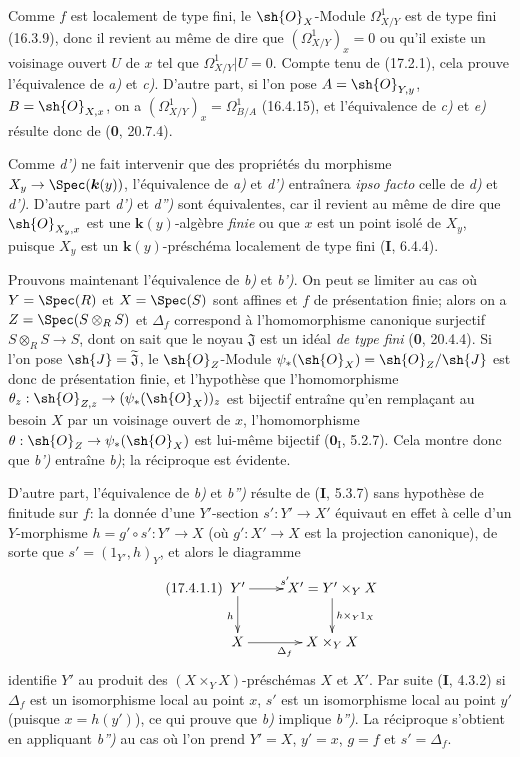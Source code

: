 Comme $f$ est localement de type fini, le $\sh{O}_X$-Module $\varOmega^1_{X/Y}$ est de type fini (16.3.9), donc il revient au même de dire que $(\varOmega^1_{X/Y})_x=0$ ou qu'il existe un voisinage ouvert $U$ de $x$ tel que $\varOmega^1_{X/Y}|U=0$. Compte tenu de (17.2.1), cela prouve l'équivalence de \emph{a)} et \emph{c)}. D'autre part, si l'on pose $A=\sh{O}_{Y,y}$, $B=\sh{O}_{X,x}$, on a $(\varOmega^1_{X/Y})_x=\Omega^1_{B/A}$ (16.4.15), et l'équivalence de \emph{c)} et \emph{e)} résulte donc de (\textbf{0}, 20.7.4).

Comme \emph{d')} ne fait intervenir que des propriétés du morphisme $X_y\to\Spec(\boldsymbol{k}(y))$, l'équivalence de \emph{a)} et \emph{d')} entraînera \emph{ipso facto} celle de \emph{d)} et \emph{d')}. D'autre part \emph{d')} et \emph{d'')} sont équivalentes, car il revient au même de dire que $\sh{O}_{X_y,x}$ est une $\boldsymbol{k}(y)$-algèbre \emph{finie} ou que $x$ est un point isolé de $X_y$, puisque $X_y$ est un $\boldsymbol{k}(y)$-préschéma localement de type fini (\textbf{I}, 6.4.4).

Prouvons maintenant l'équivalence de \emph{b)} et \emph{b')}. On peut se limiter au cas où $Y=\Spec(R)$ et $X=\Spec(S)$ sont affines et $f$ de présentation finie; alors on a $Z=\Spec(S\otimes_R S)$ et $\Delta_f$ correspond à l'homomorphisme canonique surjectif $S\otimes_R S\to S$, dont on sait que le noyau $\mathfrak{J}$ est un idéal \emph{de type fini} (\textbf{0}, 20.4.4). Si l'on pose $\sh{J}=\widetilde{\mathfrak{J}}$, le $\sh{O}_Z$-Module $\psi_*(\sh{O}_X)=\sh{O}_Z/\sh{J}$ est donc de présentation finie, et l'hypothèse que l'homomorphisme $\theta_z: \sh{O}_{Z,z}\to(\psi_*(\sh{O}_X))_z$ est bijectif entraîne qu'en remplaçant au besoin $X$ par un voisinage ouvert de $x$, l'homomorphisme $\theta:\sh{O}_Z\to\psi_*(\sh{O}_X)$ est lui-même bijectif ($\mathbf{0}_{\mathrm I}$, 5.2.7). Cela montre donc que \emph{b')} entraîne \emph{b)}; la réciproque est évidente.

D'autre part, l'équivalence de \emph{b)} et \emph{b'')} résulte de (\textbf{I}, 5.3.7) sans hypothèse de finitude sur $f$: la donnée d'une $Y'$-section $s':Y'\to X'$ équivaut en effet à celle d'un
$Y$-morphisme $h=g'\circ s':Y'\to X$ (où $g':X'\to X$ est la projection canonique), de sorte que $s'=(1_{Y'},h)_Y$, et alors le diagramme
\[
\tag{17.4.1.1}
\label{IV.17.4.1.1}
\xymatrix{
Y' \ar[r]^{s'} \ar[d]_h & X'=Y'\times_Y X \ar[d]^{h\times_Y 1_X}\\
X \ar[r]_{\Delta_f} & X\times_Y X
}
\]
identifie $Y'$ au produit des $(X\times_Y X)$-préschémas $X$ et $X'$. Par suite (\textbf{I}, 4.3.2) si $\Delta_f$ est un isomorphisme local au point $x$, $s'$ est un isomorphisme local au point $y'$ (puisque $x=h(y')$), ce qui prouve que \emph{b)} implique \emph{b'')}. La réciproque s'obtient en appliquant \emph{b'')} au cas où l'on prend $Y'=X$, $y'=x$, $g=f$ et $s'=\Delta_f$.

